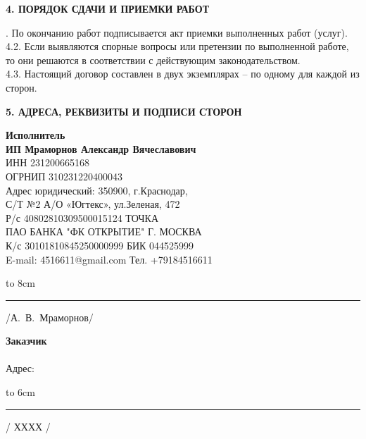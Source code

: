 \begin{center}
	\textbf{4. ПОРЯДОК СДАЧИ И ПРИЕМКИ РАБОТ}
\end{center}
\vspace{-3mm}
 . По окончанию работ подписывается акт приемки выполненных работ (услуг).\\
4.2. Если выявляются спорные вопросы или претензии по выполненной работе, то они решаются в соответствии с действующим законодательством.\\
4.3. Настоящий договор составлен в двух экземплярах – по одному для каждой из сторон.


\begin{center}
	\textbf{5. АДРЕСА, РЕКВИЗИТЫ И ПОДПИСИ СТОРОН}
\end{center}

\noindent\parbox[l][5cm]{8cm}
{\begin{flushleft}
\small\textbf{Исполнитель\\ ИП Мраморнов Александр Вячеславович\\} 
\footnotesize {ИНН 231200665168\\
ОГРНИП 310231220400043}\\
\footnotesize{Адрес юридический: 350900, г.Краснодар,\\
С/Т №2 А/О «Югтекс», ул.Зеленая, 472\\
Р/с 40802810309500015124   ТОЧКА\\
ПАО БАНКА "ФК ОТКРЫТИЕ" Г. МОСКВА\\
К/с 30101810845250000999 БИК   044525999\\
E-mail: 4516611@gmail.com  Тел. +79184516611 }
   	\end{flushleft}
   \vspace{5mm}
  
\hbox to 8cm{\rule{40mm}{0.1mm} /А.~В.~Мраморнов/}}\hfill\parbox[l][5cm]{8cm}
{
\begin{flushleft}
	\small\textbf{Заказчик\\ \\} 
	Адрес:\\
\end{flushleft}
\vspace{28mm}
\hbox to 6cm{\rule{40mm}{0.1mm} / ХХХХ /   }}
                                       

